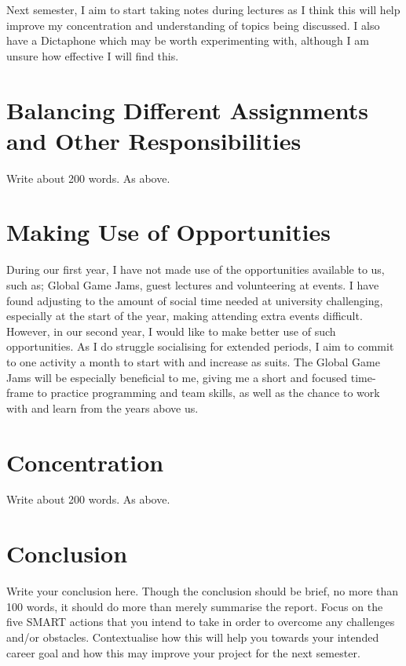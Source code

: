 \documentclass{scrartcl}
\begin{document}
Next semester, I aim to start taking notes during lectures as I think this will help improve my concentration and understanding of topics being discussed. I also have a Dictaphone which may be worth experimenting with, although I am unsure how effective I will find this.

\section{Balancing Different Assignments and Other Responsibilities}

Write about 200 words. As above.

\section{Making Use of Opportunities}

During our first year, I have not made use of the opportunities available to us, such as; Global Game Jams, guest lectures and volunteering at events. I have found adjusting to the amount of social time needed at university challenging, especially at the start of the year, making attending extra events difficult. However, in our second year, I would like to make better use of such opportunities. As I do struggle socialising for extended periods, I aim to commit to one activity a month to start with and increase as suits. The Global Game Jams will be especially beneficial to me, giving me a short and focused time-frame to practice programming and team skills, as well as the chance to work with and learn from the years above us.


\section{Concentration}

Write about 200 words. As above.


\section{Conclusion}

Write your conclusion here. Though the conclusion should be brief, no more than 100 words, it should do more than merely summarise the report. Focus on the five SMART actions that you intend to take in order to overcome any challenges and/or obstacles. Contextualise how this will help you towards your intended career goal and how this may improve your project for the next semester.



\end{document}
